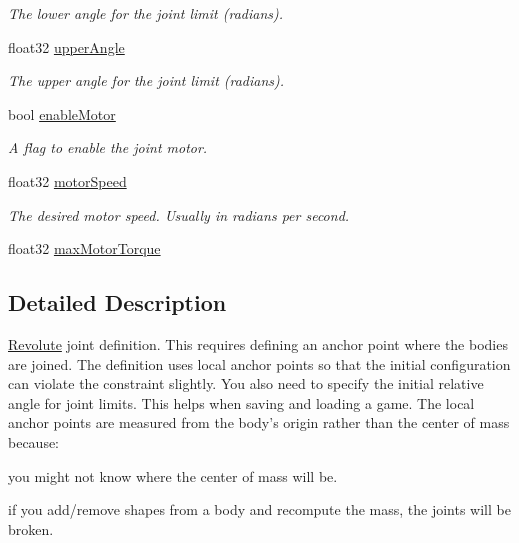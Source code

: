 \begin{DoxyCompactItemize}
\begin{DoxyCompactList}\small\item\em The lower angle for the joint limit (radians). \end{DoxyCompactList}\item 
\hypertarget{structb2_revolute_joint_def_a692cfe333ad12afd5753a6ec54e39a66}{float32 \hyperlink{structb2_revolute_joint_def_a692cfe333ad12afd5753a6ec54e39a66}{upper\-Angle}}\label{structb2_revolute_joint_def_a692cfe333ad12afd5753a6ec54e39a66}

\begin{DoxyCompactList}\small\item\em The upper angle for the joint limit (radians). \end{DoxyCompactList}\item 
\hypertarget{structb2_revolute_joint_def_aa94d9e66be9f03818d0cfbd9c70b2996}{bool \hyperlink{structb2_revolute_joint_def_aa94d9e66be9f03818d0cfbd9c70b2996}{enable\-Motor}}\label{structb2_revolute_joint_def_aa94d9e66be9f03818d0cfbd9c70b2996}

\begin{DoxyCompactList}\small\item\em A flag to enable the joint motor. \end{DoxyCompactList}\item 
\hypertarget{structb2_revolute_joint_def_aced7cf768f4dcc3561576a39c7b92ec4}{float32 \hyperlink{structb2_revolute_joint_def_aced7cf768f4dcc3561576a39c7b92ec4}{motor\-Speed}}\label{structb2_revolute_joint_def_aced7cf768f4dcc3561576a39c7b92ec4}

\begin{DoxyCompactList}\small\item\em The desired motor speed. Usually in radians per second. \end{DoxyCompactList}\item 
float32 \hyperlink{structb2_revolute_joint_def_a9fc1b67fe6d1bc31f88cc2cfd681fe30}{max\-Motor\-Torque}
\end{DoxyCompactItemize}


\subsection{Detailed Description}
\hyperlink{class_revolute}{Revolute} joint definition. This requires defining an anchor point where the bodies are joined. The definition uses local anchor points so that the initial configuration can violate the constraint slightly. You also need to specify the initial relative angle for joint limits. This helps when saving and loading a game. The local anchor points are measured from the body's origin rather than the center of mass because\-:
\begin{DoxyEnumerate}
\item you might not know where the center of mass will be.
\item if you add/remove shapes from a body and recompute the mass, the joints will be broken. 
\end{DoxyEnumerate}

